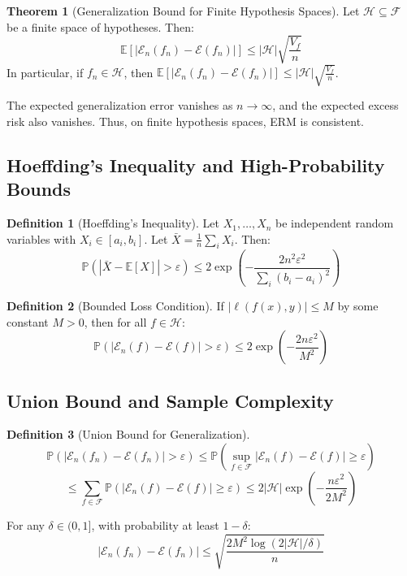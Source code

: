 \documentclass[12pt,a4paper]{article}
\theoremstyle{definition}
\newtheorem{definition}{Definition}[section]
\newtheorem{theorem}{Theorem}[section]
\begin{document}
\begin{theorem}[Generalization Bound for Finite Hypothesis Spaces]
Let $\mathcal{H} \subseteq \mathcal{F}$ be a finite space of hypotheses. Then:
\[
\mathbb{E}[|\mathcal{E}_n(f_n) - \mathcal{E}(f_n)|] \leq |\mathcal{H}| \sqrt{\frac{V_f}{n}}
\]
In particular, if $f_n \in \mathcal{H}$, then $\mathbb{E}[|\mathcal{E}_n(f_n) - \mathcal{E}(f_n)|] \leq |\mathcal{H}| \sqrt{\frac{V_f}{n}}$.

The expected generalization error vanishes as $n \to \infty$, and the expected excess risk also vanishes. Thus, on finite hypothesis spaces, ERM is consistent.
\end{theorem}

\subsection{Hoeffding's Inequality and High-Probability Bounds}

\begin{definition}[Hoeffding's Inequality]
Let $X_1, \ldots, X_n$ be independent random variables with $X_i \in [a_i, b_i]$. Let $\bar{X} = \frac{1}{n}\sum_i X_i$. Then:
\[
\mathbb{P}(|\bar{X} - \mathbb{E}[X]| > \varepsilon) \leq 2\exp\left(-\frac{2n^2 \varepsilon^2}{\sum_i (b_i - a_i)^2}\right)
\]
\end{definition}

\begin{definition}[Bounded Loss Condition]
If $|\ell(f(x), y)| \leq M$ by some constant $M > 0$, then for all $f \in \mathcal{H}$:
\[
\mathbb{P}(|\mathcal{E}_n(f) - \mathcal{E}(f)| > \varepsilon) \leq 2\exp\left(-\frac{2n\varepsilon^2}{M^2}\right)
\]
\end{definition}

\subsection{Union Bound and Sample Complexity}

\begin{definition}[Union Bound for Generalization]
\[
\mathbb{P}(|\mathcal{E}_n(f_n) - \mathcal{E}(f_n)| > \varepsilon) \leq \mathbb{P}\left(\sup_{f \in \mathcal{F}} |\mathcal{E}_n(f) - \mathcal{E}(f)| \geq \varepsilon\right)
\]
\[
\leq \sum_{f \in \mathcal{F}} \mathbb{P}(|\mathcal{E}_n(f) - \mathcal{E}(f)| \geq \varepsilon) \leq 2|\mathcal{H}| \exp\left(-\frac{n\varepsilon^2}{2M^2}\right)
\]

For any $\delta \in (0,1]$, with probability at least $1 - \delta$:
\[
|\mathcal{E}_n(f_n) - \mathcal{E}(f_n)| \leq \sqrt{\frac{2M^2 \log(2|\mathcal{H}|/\delta)}{n}}
\]
\end{definition}
\end{document}
